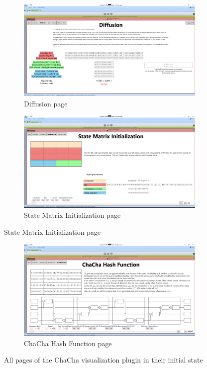 \begin{figure}
\ContinuedFloat
\begin{subfigure}{\textwidth}
  \centering
  \includegraphics[width=\textwidth]{figures/ct2/all-pages/3-diffusion.png}
  \caption{Diffusion page}
\end{subfigure}
\begin{subfigure}{\textwidth}
  \centering
  \includegraphics[width=\textwidth]{figures/ct2/all-pages/4-statematrix.png}
  \caption{State Matrix Initialization page}
\end{subfigure}
\end{figure}
\begin{figure}
\ContinuedFloat
\begin{subfigure}{\textwidth}
  \centering
  \includegraphics[width=\textwidth]{figures/ct2/all-pages/5-chachahash.png}
  \caption{ChaCha Hash Function page}
\end{subfigure}
\caption[All pages of the ChaCha visualization plug-in]{All pages of the ChaCha visualization plugin in their initial state}
\label{fig:allpages}
\end{figure}

